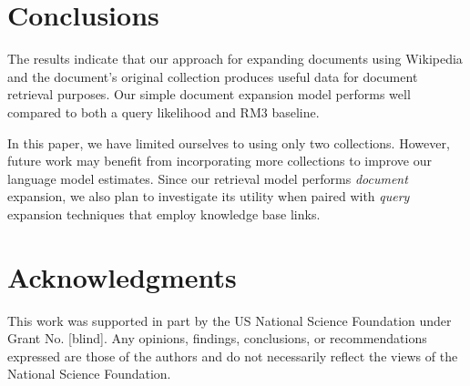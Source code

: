 \documentclass{article}
\begin{document}
\section{Conclusions}\label{section.conclusions}

The results indicate that our approach for expanding documents using Wikipedia and the document's original collection produces useful data for document retrieval purposes. Our simple document expansion model performs well compared to both a query likelihood and RM3 baseline.

In this paper, we have limited ourselves to using only two collections. However, future work may benefit from incorporating more collections to improve our language model estimates. Since our retrieval model performs \textit{document} expansion, we also plan to investigate its utility when paired with \textit{query} expansion techniques that employ knowledge base links.

\section{Acknowledgments}\label{section.acknowledgments}
This work was supported in part by the US National Science Foundation under Grant No. [blind]. Any opinions, findings, conclusions, or recommendations expressed are those of the authors and do not necessarily reflect the views of the National Science Foundation.



  
\end{document}
